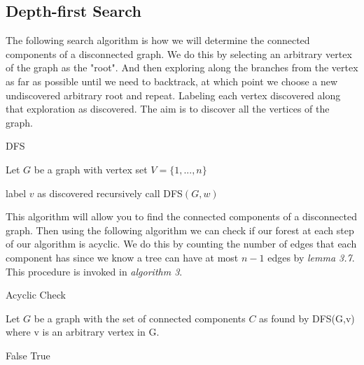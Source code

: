 \documentclass[../main.tex]{subfiles}
\begin{document}
\subsection{Depth-first Search}
The following search algorithm is how we will determine the connected components of a disconnected graph. We do this by selecting an arbitrary vertex of the graph as the "root". And then exploring along the branches from the vertex as far as possible until we need to backtrack, at which point we choose a new undiscovered arbitrary root and repeat. Labeling each vertex discovered along that exploration as discovered. The aim is to discover all the vertices of the graph.

\begin{algorithm}[H]
\caption{DFS\cite{wiki}}\label{dfs}
Let $G$ be a graph with vertex set $V = \{1,...,n\}$
\begin{algorithmic}[1]
\State label $v$ as discovered
	 	\State recursively call DFS$(G,w)$
	\EndIf
\EndFor
\EndProcedure
\end{algorithmic}
\end{algorithm}

\noindent This algorithm will allow you to find the connected components of a disconnected graph. Then using the following algorithm we can check if our forest at each step of our algorithm is acyclic. We do this by counting the number of edges that each component has since we know a tree can have at most $n-1$ edges by \textit{lemma 3.7}. This procedure is invoked in \textit{algorithm 3}.

\begin{algorithm}[H]
\caption{Acyclic Check}\label{acyclic}
Let $G$ be a graph with the set of connected components $C$ as found by DFS(G,v) where v is an arbitrary vertex in G.
\begin{algorithmic}[1]
		\Return False
	\EndIf
\EndFor
	\Return True
\EndProcedure
\end{algorithmic}
\end{algorithm}
\end{document}
